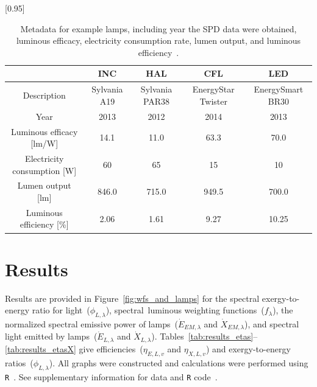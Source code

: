 \documentclass[energies,article,accept,moreauthors,pdftex]{Definitions/mdpi}\usepackage[]{graphicx}\usepackage[]{color}
\providecommand{\DIFdelbegin}{} %
\providecommand{\DIFdelend}{} %
\newcommand{\DIFscaledelfig}{0.5}
\newlength{\DIFdelgraphicswidth} %
\newlength{\DIFdelgraphicsheight} %
\newcommand{\DIFdelincludegraphics}[2][]{%
\sbox{\DIFdelgraphicsbox}{\DIFOincludegraphics[#1]{#2}}%
\settoboxwidth{\DIFdelgraphicswidth}{\DIFdelgraphicsbox} %
\settoboxtotalheight{\DIFdelgraphicsheight}{\DIFdelgraphicsbox} %
\scalebox{\DIFscaledelfig}{%
\parbox[b]{\DIFdelgraphicswidth}{\usebox{\DIFdelgraphicsbox}\\[-\baselineskip] \rule{\DIFdelgraphicswidth}{0em}}\llap{\resizebox{\DIFdelgraphicswidth}{\DIFdelgraphicsheight}{%
\setlength{\unitlength}{\DIFdelgraphicswidth}%
\begin{picture}(1,1)%
\thicklines\linethickness{2pt} %
{\color[rgb]{1,0,0}\put(0,0){\framebox(1,1){}}}%
{\color[rgb]{1,0,0}\put(0,0){\line( 1,1){1}}}%
{\color[rgb]{1,0,0}\put(0,1){\line(1,-1){1}}}%
\end{picture}%
}\hspace*{3pt}}} %
} %
\DeclareRobustCommand{\DIFdelbegin}{\DIFOdelbegin \let\includegraphics\DIFdelincludegraphics} %
\DeclareRobustCommand{\DIFdelend}{\DIFOaddend \let\includegraphics\DIFOincludegraphics} %
\begin{document}
\begin{table}[H]
\centering
\caption{Metadata for example lamps, including 
                     year the SPD data were obtained, 
                     luminous efficacy, 
                     electricity consumption rate, lumen output, and
                     luminous efficiency~\cite{aube2013}.} 
\label{tab:lamps}
\begingroup\footnotesize
\scalebox{0.95}[0.95]{
\begin{tabular}{ccccc}
  \toprule
 & \textbf{INC} & \textbf{HAL} & \textbf{CFL} & \textbf{LED} \\ 
  \midrule
Description & Sylvania A19 & Sylvania PAR38 & EnergyStar Twister & EnergySmart BR30 \\ 
  Year & 2013 & 2012 & 2014 & 2013 \\ 
  Luminous efficacy [lm/W] & 14.1 & 11.0 & 63.3 & 70.0 \\ 
  Electricity consumption [W] & 60 & 65 & 15 & 10 \\ 
  Lumen output [lm] & 846.0 & 715.0 & 949.5 & 700.0 \\ 
  Luminous efficiency [\%] &  2.06 &  1.61 &  9.27 & 10.25 \\ 
   \bottomrule
\end{tabular}}
\endgroup
\end{table}




\section{Results}
\label{sec:results}

\DIFdelbegin %

\DIFdelend Results are provided in Figure~\ref{fig:wfs_and_lamps} for 
the spectral exergy-to-energy ratio for light~($\phi_{L,\lambda}$), 
\mbox{spectral luminous} weighting functions~($f_\lambda$),
the normalized spectral emissive power of lamps~($\dot{E}_{EM,\lambda}$ and $\dot{X}_{EM,\lambda}$), and
spectral light emitted by lamps~($\dot{E}_{L,\lambda}$ and $\dot{X}_{L,\lambda}$).
Tables~\ref{tab:results_etas}--\ref{tab:results_etasX}
give efficiencies~($\eta_{E,L,v}$ and $\eta_{X,L,v}$) and exergy-to-energy ratios~($\phi_{L,\lambda}$).
All graphs were constructed and calculations were performed using \texttt{R}~\cite{R-software}.
See supplementary information for data and \texttt{R} code~\cite{heun2020}.
\end{document}
